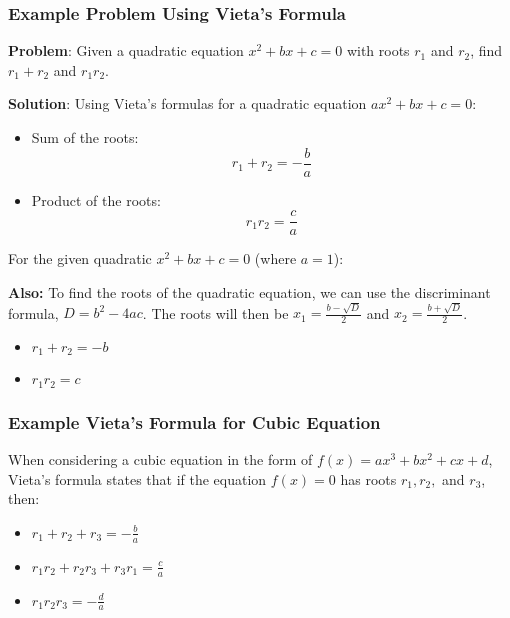         \subsubsection*{Example Problem Using Vieta's Formula}

        \textbf{Problem}: Given a quadratic equation \(x^2 + bx + c = 0\) with roots \(r_1\) and \(r_2\), find \(r_1 + r_2\) and \(r_1r_2\).

        \textbf{Solution}:
        Using Vieta's formulas for a quadratic equation \(ax^2 + bx + c = 0\):

        \begin{itemize}
            \item Sum of the roots:
            \[
            r_1 + r_2 = -\frac{b}{a}
            \]
            \item Product of the roots:
            \[
            r_1r_2 = \frac{c}{a}
            \]
        \end{itemize}

        For the given quadratic \(x^2 + bx + c = 0\) (where \(a = 1\)):

        \textbf{Also:}
        To find the roots of the quadratic equation, we can use the discriminant formula, \( D = b^2 - 4ac \). The roots will then be \( x_1 = \frac{b - \sqrt{D}}{2} \) and \( x_2 = \frac{b + \sqrt{D}}{2} \).


        \begin{itemize}
            \item \(r_1 + r_2 = -b\)
            \item \(r_1r_2 = c\)
        \end{itemize}

        \subsubsection*{Example Vieta's Formula for Cubic Equation}

        When considering a cubic equation in the form of \( f(x) = ax^3 + bx^2 + cx + d \), Vieta's formula states that if the equation \( f(x) = 0 \) has roots \( r_1, r_2, \) and \( r_3 \), then:

        \begin{itemize}
            \item \( r_1 + r_2 + r_3 = -\frac{b}{a} \)
            \item \( r_1r_2 + r_2r_3 + r_3r_1 = \frac{c}{a} \)
            \item \( r_1r_2r_3 = -\frac{d}{a} \)
        \end{itemize}

